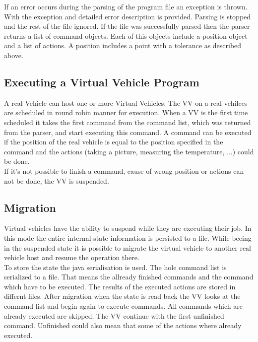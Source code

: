 If an error occurs during the parsing of the program file an exception is thrown. With the exception and detailed error description is provided. 
Parsing is stopped and the rest of the file ignored. If the file was successfully parsed then the parser returns a list of command objects. Each of 
this objects include a position object and a list of actions. A position includes a point with a tolerance as described above.


\subsection{Executing a Virtual Vehicle Program}

A real Vehicle can host one or more Virtual Vehicles. The VV on a real vehilces are scheduled in round robin manner for execution. When a VV is the first time scheduled it takes the first command
from the command list, which was returned from the parser, and start executing this command. A command can be executed if the position of the real vehicle is equal to the position specified in the command and the 
actions (taking a picture, measuring the temperature, ...) could be done. \\
If it's not possible to finish a command, cause of wrong position or actions can not be done, the VV is suspended.

\subsection{Migration}

Virtual vehicles have the ability to suspend while they are executing their job. In this mode the entire internal state 
information is persisted to a file. While beeing in the suspended state it is possible to migrate the virtual 
vehicle to another real vehicle host and resume the operation there. \\
To store the state the java serialisation is used. The hole command list is serialized to a file. That means the allready finished commands 
and the command which have to be executed. The results of the executed actions are stored in differnt files. After migration when the
state is read back the VV looks at the command list and begin again to execute commands. All commands which are already executed are skipped. The VV 
continue with the first unfinished command. Unfinished could also mean that some of the actions where already executed.

